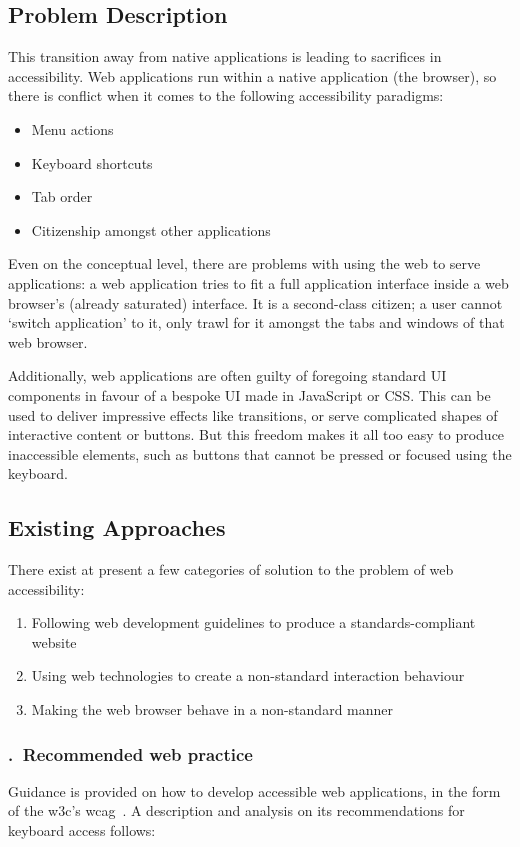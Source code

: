 \documentclass[11pt,openright,a4paper]{report}
\begin{document}
\subsection{Problem Description}
This transition away from native applications is leading to sacrifices in accessibility. Web applications run within a native application (the browser), so there is conflict when it comes to the following accessibility paradigms:
\begin{itemize}
 \item Menu actions
 \item Keyboard shortcuts
 \item Tab order
 \item Citizenship amongst other applications
\end{itemize}

Even on the conceptual level, there are problems with using the web to serve applications: a web application tries to fit a full application interface inside a web browser's (already saturated) interface. It is a second-class citizen; a user cannot `switch application' to it, only trawl for it amongst the tabs and windows of that web browser.

Additionally, web applications are often guilty of foregoing standard UI components in favour of a bespoke UI made in JavaScript or CSS. This can be used to deliver impressive effects like transitions, or serve complicated shapes of interactive content or buttons. But this freedom makes it all too easy to produce inaccessible elements, such as buttons that cannot be pressed or focused using the keyboard.

\subsection{Existing Approaches}
There exist at present a few categories of solution to the problem of web accessibility:
\begin{enumerate}
\item Following web development guidelines to produce a standards-compliant website
\item Using web technologies to create a non-standard interaction behaviour
\item Making the web browser behave in a non-standard manner
\end{enumerate}
\newcommand{\anexistingapproach}[1]{\subsubsection{.~#1}}
\anexistingapproach{Recommended web practice}
\label{recommendedpracticesection}
Guidance is provided on how to develop accessible web applications, in the form of the \gls{w3c}'s \gls{wcag}~\cite{chisholm2001web,wcag}. A description and analysis on its recommendations for keyboard access follows:
\end{document}

